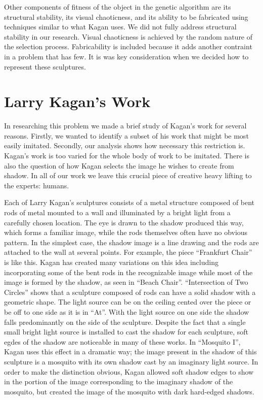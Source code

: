 \documentclass[10pt]{article}
\begin{document}
Other components of fitness of the object in the genetic algorithm
are its structural stability, its visual chaoticness, and its ability
to be fabricated using techniques similar to what Kagan uses. We did
not fully address structural stability in our research. Visual
chaoticness is achieved by the random nature of the selection process.
Fabricability is included because it adds another contraint in a
problem that has few. It is was key consideration when we decided
how to represent these sculptures.

\section{Larry Kagan's Work} \label{kagan}
In researching this problem we made a brief study of Kagan's work for
several reasons. Firstly, we wanted to identify a subset of his work
that might be most easily imitated. Secondly, our analysis shows how
necessary this restriction is. Kagan's work is too varied for the
whole body of work to be imitated. There is also the question of how
Kagan selects the image he wishes to create from shadow. In all of our
work we leave this crucial piece of creative heavy lifting to the
experts: humans.

Each of Larry Kagan's sculptures consists of a metal structure
composed of bent rods of metal mounted to a wall and illuminated by
a bright light from a carefully chosen location. The eye is drawn to
the shadow produced this way, which forms a familiar image, while the
rods themselves often have no obvious pattern. In the simplest case,
the shadow image is a line drawing and the rods are attached to the
wall at several points. For example, the piece ``Frankfurt Chair'' is
like this. Kagan has created many variations on this idea including
incorporating some of the bent rods in the recognizable image while
most of the image is formed by the shadow, as seen in ``Beach Chair''.
``Intersection of Two Circles'' shows that a sculpture composed of rods
can have a solid shadow with a geometric shape. The light source can
be on the ceiling cented over the piece or be off to one side as it
is in ``At''. With the light source on one side the shadow falls
predominantly on the side of the sculpture. Despite the fact that a
single small bright light source is installed to cast the shadow for
each sculpture, soft egdes of the shadow are noticeable in many of
these works. In ``Mosquito I'', Kagan uses this effect in a dramatic
way; the image present in the shadow of this sculpture is a mosquito
with its own shadow cast by an imaginary light source. In order to
make the distinction obvious, Kagan allowed soft shadow edges to show
in the portion of the image corresponding to the imaginary shadow of
the mosquito, but created the image of the mosquito with dark
hard-edged shadows.
\end{document}

